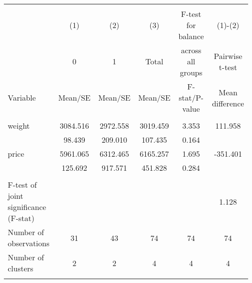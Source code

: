
\begin{tabular}{@{\extracolsep{5pt}}lccccc}
\\[-1.8ex]\hline \hline \\[-1.8ex]
 & \multicolumn{1}{c}{(1)}  & \multicolumn{1}{c}{(2)}  & \multicolumn{1}{c}{(3)}  & \multicolumn{1}{c}{F-test for balance} & \multicolumn{1}{c}{(1)-(2)} \\
 & \multicolumn{1}{c}{0}  & \multicolumn{1}{c}{1}  & \multicolumn{1}{c}{Total}  & \multicolumn{1}{c}{across all groups} & \multicolumn{1}{c}{Pairwise t-test}  \\
Variable & Mean/SE & Mean/SE & Mean/SE & F-stat/P-value & Mean difference \\ \hline \\[-1.8ex] 
weight   &  3084.516    &  2972.558    &  3019.459    &     3.353    &   111.958   \\
 &    98.439  &   209.010  &   107.435  &     0.164  &   \\
price   &  5961.065    &  6312.465    &  6165.257    &     1.695    &  -351.401   \\
 &   125.692  &   917.571  &   451.828  &     0.284  &   \\
\hline \\[-1.8ex]
F-test of joint significance (F-stat) &   &   &   &     &      1.128   \\
Number of observations  & 31   & 43   & 74  & 74 & 74   \\
Number of clusters & 2  & 2  & 4  & 4 & 4   \\
\hline \\[-1.8ex]

\end{tabular}
